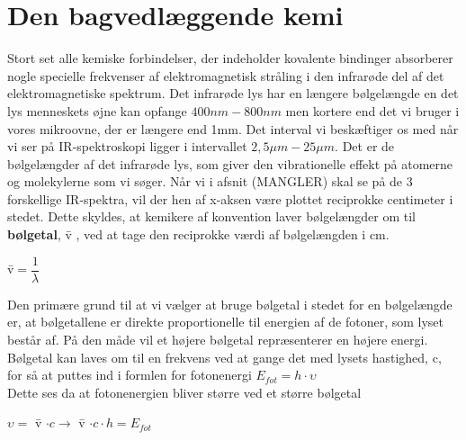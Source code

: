 \section{Den bagvedlæggende kemi}
Stort set alle kemiske forbindelser, der indeholder kovalente bindinger absorberer nogle specielle frekvenser af elektromagnetisk stråling i den infrarøde del af det elektromagnetiske spektrum. Det infrarøde lys har en længere bølgelængde en det lys menneskets øjne kan opfange $400nm - 800nm$ men kortere end det vi bruger i vores mikroovne, der er længere end 1mm. Det interval vi beskæftiger os med når vi ser på IR-spektroskopi ligger i intervallet $2,5 \mu m- 25 \mu m $. Det er de bølgelængder af det infrarøde lys, som giver den vibrationelle effekt på atomerne og molekylerne som vi søger. Når vi i afsnit (MANGLER) skal se på de 3 forskellige IR-spektra, vil der hen af x-aksen være plottet reciprokke centimeter i stedet. Dette skyldes, at kemikere af konvention laver bølgelængder om til \textbf{bølgetal}, \={v} , ved at tage den reciprokke værdi af bølgelængden i cm. 

\begin{center}
\={v}$= \dfrac{1}{\lambda}$
\end{center}

Den primære grund til at vi vælger at bruge bølgetal i stedet for en bølgelængde er, at bølgetallene er direkte proportionelle til energien af de fotoner, som lyset består af. På den måde vil et højere bølgetal repræsenterer en højere energi. Bølgetal kan laves om til en frekvens ved at gange det med lysets hastighed, c, for så at puttes ind i formlen for fotonenergi $E_{fot} = h \cdot \upsilon$
\\
Dette ses da at fotonenergien bliver større ved et større bølgetal 
\\
\begin{center}
$\upsilon =$ \={v} $\cdot c \rightarrow$ \={v} $\cdot c \cdot h = E_{fot}$
\end{center}

